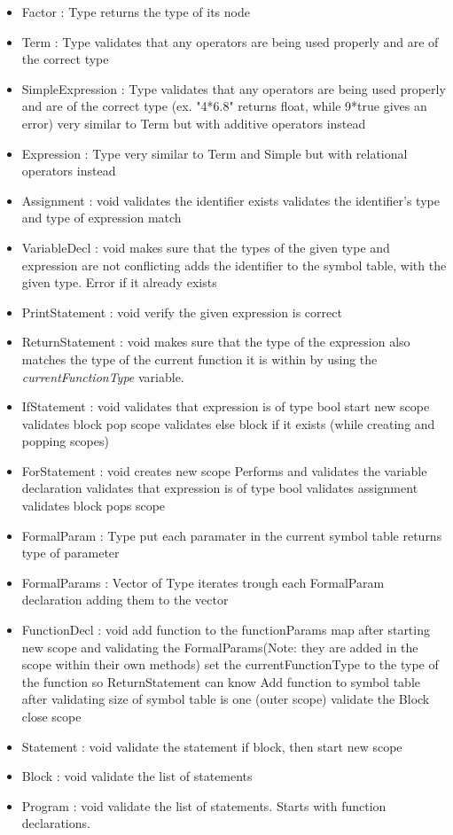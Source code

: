 \begin{itemize}
	\item Factor : Type
		\subitem returns the type of its node
	\item Term : Type
		\subitem validates that any operators are being used properly and are of the correct type
	\item SimpleExpression : Type
		\subitem validates that any operators are being used properly and are of the correct type (ex. "4*6.8" returns float, while 9*true gives an error)
		\subitem very similar to Term but with additive operators instead
	\item Expression : Type
		\subitem very similar to Term and Simple but with relational operators instead
	\item Assignment : void
		\subitem validates the identifier exists
		\subitem validates the identifier's type and type of expression match
	\item VariableDecl : void
		\subitem makes sure that the types of the given type and expression are not conflicting
		\subitem adds the identifier to the symbol table, with the given type. Error if it already exists
	\item PrintStatement : void
		\subitem verify the given expression is correct
	\item ReturnStatement : void
		\subitem makes sure that the type of the expression also matches the type of the current function it is within by using the \textit{currentFunctionType} variable.
	\item IfStatement : void
		\subitem validates that expression is of type bool
		\subitem start new scope
		\subitem validates block
		\subitem pop scope
		\subitem validates else block if it exists (while creating and popping scopes)
	\item ForStatement : void
		\subitem creates new scope
		\subitem Performs and validates the variable declaration
		\subitem validates that expression is of type bool
		\subitem validates assignment
		\subitem validates block
		\subitem pops scope
	\item FormalParam : Type
		\subitem put each paramater in the current symbol table
		\subitem returns type of parameter
	\item FormalParams : Vector of Type
		\subitem iterates trough each FormalParam declaration adding them to the vector
	\item FunctionDecl : void
		\subitem add function to the functionParams map after starting new scope and  validating the FormalParams(Note: they are added in the scope within their own methods)
		\subitem set the currentFunctionType to the type of the function so ReturnStatement can know
		Add function to symbol table after validating size of symbol table is one (outer scope)
		\subitem validate the Block
		\subitem close scope
	\item Statement : void
		\subitem validate the statement
		\subitem if block, then start new scope
	\item Block : void
		\subitem validate the list of statements
	\item Program : void
		\subitem validate the list of statements. Starts with function declarations.
\end{itemize}

